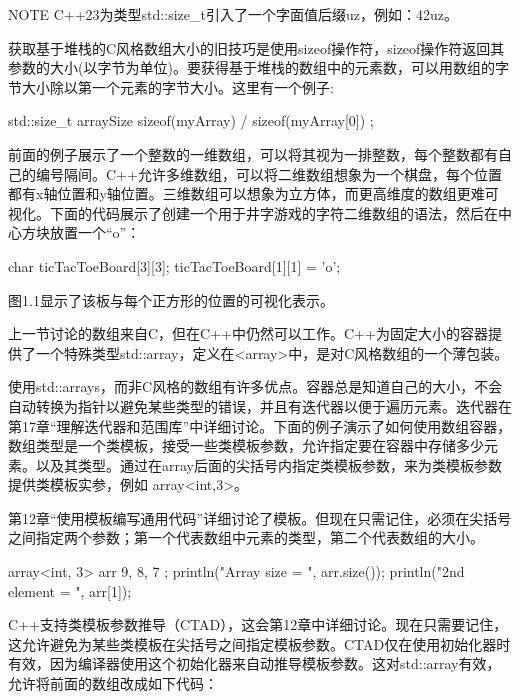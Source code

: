 
\begin{myNotic}{NOTE}
C++23为类型std::size\_t引入了一个字面值后缀uz，例如：42uz。
\end{myNotic}

获取基于堆栈的C风格数组大小的旧技巧是使用sizeof操作符，sizeof操作符返回其参数的大小(以字节为单位)。要获得基于堆栈的数组中的元素数，可以用数组的字节大小除以第一个元素的字节大小。这里有一个例子:

\begin{cpp}
std::size_t arraySize { sizeof(myArray) / sizeof(myArray[0]) };
\end{cpp}

前面的例子展示了一个整数的一维数组，可以将其视为一排整数，每个整数都有自己的编号隔间。C++允许多维数组，可以将二维数组想象为一个棋盘，每个位置都有x轴位置和y轴位置。三维数组可以想象为立方体，而更高维度的数组更难可视化。下面的代码展示了创建一个用于井字游戏的字符二维数组的语法，然后在中心方块放置一个“o”：

\begin{cpp}
char ticTacToeBoard[3][3];
ticTacToeBoard[1][1] = 'o';
\end{cpp}

图1.1显示了该板与每个正方形的位置的可视化表示。



上一节讨论的数组来自C，但在C++中仍然可以工作。C++为固定大小的容器提供了一个特殊类型std::array，定义在<array>中，是对C风格数组的一个薄包装。

使用std::arrays，而非C风格的数组有许多优点。容器总是知道自己的大小，不会自动转换为指针以避免某些类型的错误，并且有迭代器以便于遍历元素。迭代器在第17章“理解迭代器和范围库”中详细讨论。下面的例子演示了如何使用数组容器，数组类型是一个类模板，接受一些类模板参数，允许指定要在容器中存储多少元素。以及其类型。通过在array后面的尖括号内指定类模板参数，来为类模板参数提供类模板实参，例如 array<int,3>。

第12章“使用模板编写通用代码”详细讨论了模板。但现在只需记住，必须在尖括号之间指定两个参数；第一个代表数组中元素的类型，第二个代表数组的大小。

\begin{cpp}
array<int, 3> arr { 9, 8, 7 };
println("Array size = {}", arr.size());
println("2nd element = {}", arr[1]);
\end{cpp}

C++支持类模板参数推导（CTAD），这会第12章中详细讨论。现在只需要记住，这允许避免为某些类模板在尖括号之间指定模板参数。CTAD仅在使用初始化器时有效，因为编译器使用这个初始化器来自动推导模板参数。这对std::array有效，允许将前面的数组改成如下代码：

